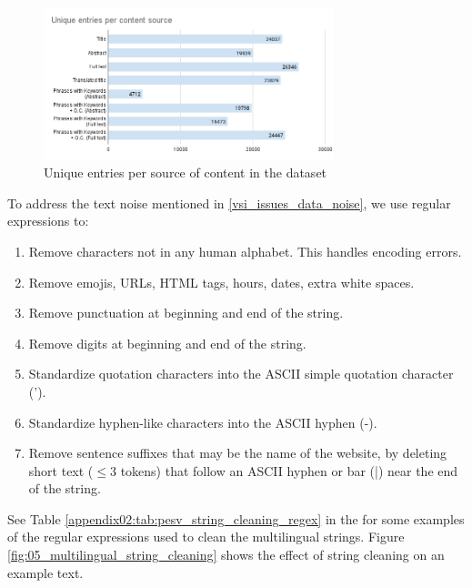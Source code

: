 \begin{figure}
    \centering
    \includegraphics[width=0.750\textwidth]{Figures/05/Unique entries per content source_keyphrases.png}
    \caption{Unique entries per source of content in the \VSI{} dataset}
    \label{fig:05_unique_entries_keyphrases_vsi}
\end{figure}


\label{vsi_data_cleaning}



\label{vsi_string_cleaning}

To address the text noise mentioned in \headerName{} \ref{vsi_issues_data_noise}, we use regular expressions to:

\begin{enumerate}
    \item Remove characters not in any human alphabet. This handles encoding errors.
    \item Remove emojis, URLs, HTML tags, hours, dates, extra white spaces.
    \item Remove punctuation at beginning and end of the string.
    \item Remove digits at beginning and end of the string.
    \item Standardize quotation characters into the ASCII simple quotation character (').
    \item Standardize hyphen-like characters into the ASCII hyphen (-).
    \item Remove sentence suffixes that may be the name of the website, by deleting short text ($\leq 3$ tokens) that follow an ASCII hyphen or bar (|) near the end of the string.
\end{enumerate}

See Table \ref{appendix02:tab:pesv_string_cleaning_regex} in the \appendixname{} for some examples of the regular expressions used to clean the multilingual strings. Figure \ref{fig:05_multilingual_string_cleaning} shows the effect of string cleaning on an example text.

